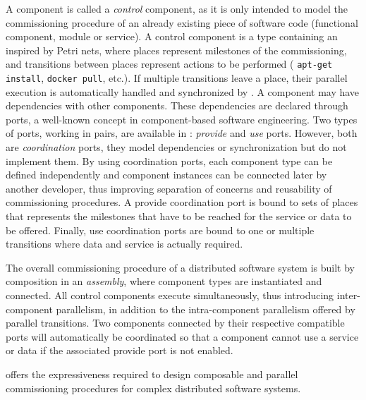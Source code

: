 A \mad component is called a \emph{control} component, as it is only
intended to model the commissioning procedure of an already existing
piece of software code (functional component, module or service). A
\mad control component is a type containing an \net inspired by Petri
nets, where places represent milestones of the commissioning, and
transitions between places represent actions to be performed (\eg
\texttt{apt-get install}, \texttt{docker pull}, etc.). If multiple
transitions leave a place, their parallel execution is automatically
handled and synchronized by \mad. A component may have dependencies
with other components. These dependencies are declared through ports,
a well-known concept in component-based software engineering. Two
types of ports, working in pairs, are available in \mad:
\emph{provide} and \emph{use} ports. However, both are
\emph{coordination} ports, \ie they model dependencies or
synchronization but do not implement them. By using coordination
ports, each component type can be defined independently and component
instances can be connected later by another developer, thus improving
separation of concerns and reusability of commissioning procedures. A
provide coordination port is bound to sets of places that represents
the milestones that have to be reached for the service or data to be
offered. Finally, use coordination ports are bound to one or multiple
transitions where data and service is actually required.

The overall commissioning procedure of a distributed software system
is built by composition in an \emph{assembly}, where component types
are instantiated and connected. All control components execute
simultaneously, thus introducing inter-component parallelism, in
addition to the intra-component parallelism offered by parallel
transitions. Two components connected by their respective compatible
ports will automatically be coordinated so that a component cannot use
a service or data if the associated provide port is not enabled.

\mad offers the expressiveness required to design composable and parallel
commissioning procedures for complex distributed software systems.

